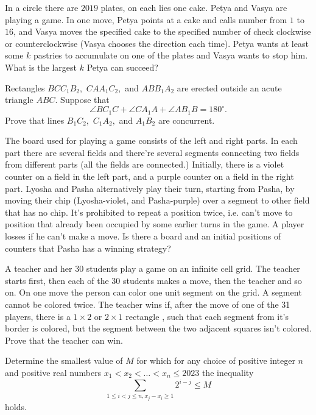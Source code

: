 \documentclass[11pt]{scrartcl}
\begin{document}
\begin{problem}[813804034055493]
In a circle there are $2019$ plates, on each lies one cake. Petya and Vasya are playing a game. In one move, Petya points at a cake and calls number from $1$ to $16$, and Vasya moves the specified cake to the specified number of
check clockwise or counterclockwise (Vasya chooses the direction each time). Petya wants at least some $k$ pastries to accumulate on one of the plates and Vasya wants to stop him. What is the largest $k$ Petya can succeed?
\end{problem}
\begin{problem}[942225649898797]
Rectangles $BCC_1B_2,$ $CAA_1C_2,$ and $ABB_1A_2$ are erected outside an acute triangle $ABC.$ Suppose that\[\angle BC_1C+\angle CA_1A+\angle AB_1B=180^{\circ}.\]Prove that lines $B_1C_2,$ $C_1A_2,$ and $A_1B_2$ are concurrent.
\end{problem}
\begin{problem}[297728211754501]
The board used for playing a game consists of the left and right parts. In each part there are several fields and there’re several segments connecting two fields from different parts (all the fields are connected.) Initially, there is a violet counter on a field in the left part, and a purple counter on a field in the right part. Lyosha and Pasha alternatively play their turn, starting from Pasha, by moving their chip (Lyosha-violet, and Pasha-purple) over a segment to other field that has no chip. It’s prohibited to repeat a position twice, i.e. can’t move to position that already been occupied by some earlier turns in the game. A player losses if he can’t make a move. Is there a board and an initial positions of counters that Pasha has a winning strategy?
\end{problem}
\begin{problem}[303061622555285]
A teacher and her 30 students play a game on an infinite cell grid. The teacher starts first, then each of the 30 students makes a move, then the teacher and so on. On one move the person can color one unit segment on the grid. A segment cannot be colored twice. The teacher wins if, after the move of one of the 31 players, there is a $1\times 2$ or $2\times 1$ rectangle , such that each segment from it's border is colored, but the segment between the two adjacent squares isn't colored. Prove that the teacher can win.
\end{problem}
\begin{problem}[678030172296176]
Determine the smallest value of $M$ for which for any choice of positive integer $n$ and positive real numbers $x_1<x_2<\ldots<x_n \le 2023$ the inequality
$$\sum_{1\le i < j \le n , x_j-x_i \ge 1} 2^{i-j}\le M$$holds.
\end{problem}
\end{document}
